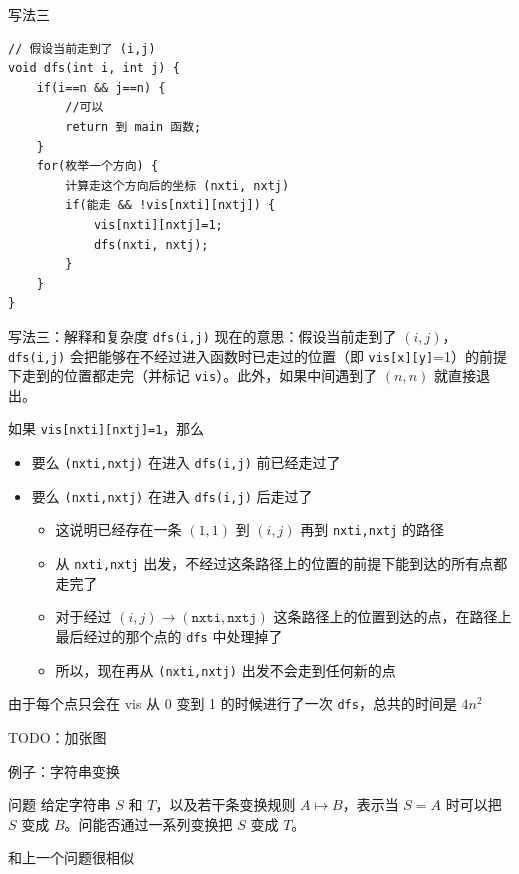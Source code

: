 \documentclass[11pt,aspectratio=169]{beamer}
\begin{document}
\begin{frame}[fragile]{写法三}
\begin{lstlisting}
// 假设当前走到了 (i,j) 
void dfs(int i, int j) {
    if(i==n && j==n) {
        //可以
        return 到 main 函数;
    }
    for(枚举一个方向) {
        计算走这个方向后的坐标 (nxti, nxtj)
        if(能走 && !vis[nxti][nxtj]) {
            vis[nxti][nxtj]=1;
            dfs(nxti, nxtj);
        }
    }
}
\end{lstlisting}    
\end{frame}

\begin{frame}{写法三：解释和复杂度}
\texttt{dfs(i,j)} 现在的意思：假设当前走到了 $(i,j)$，\texttt{dfs(i,j)} 会把能够在不经过进入函数时已走过的位置（即 \texttt{vis[x][y]}=1）的前提下走到的位置都走完（并标记 \texttt{vis}）。此外，如果中间遇到了 $(n,n)$ 就直接退出。

如果 \texttt{vis[nxti][nxtj]=1}，那么

\begin{itemize}
    \item 要么 \texttt{(nxti,nxtj)} 在进入 \texttt{dfs(i,j)} 前已经走过了
    \item 要么 \texttt{(nxti,nxtj)} 在进入 \texttt{dfs(i,j)} 后走过了
    \begin{itemize}
        \item 这说明已经存在一条 $(1,1)$ 到 $(i,j)$ 再到 \texttt{nxti,nxtj} 的路径
        \item 从 \texttt{nxti,nxtj} 出发，不经过这条路径上的位置的前提下能到达的所有点都走完了
        \item 对于经过 $(i,j)\to \mathtt{(nxti,nxtj)}$ 这条路径上的位置到达的点，在路径上最后经过的那个点的 \texttt{dfs} 中处理掉了
        \item 所以，现在再从 \texttt{(nxti,nxtj)} 出发不会走到任何新的点
    \end{itemize}
\end{itemize}

由于每个点只会在 vis 从 0 变到 1 的时候进行了一次 \texttt{dfs}，总共的时间是 $4n^2$

TODO：加张图

\end{frame}

\begin{frame}{例子：字符串变换}
    \begin{block}{问题}
        给定字符串 $S$ 和 $T$，以及若干条变换规则 $A\mapsto B$，表示当 $S=A$ 时可以把 $S$ 变成 $B$。问能否通过一系列变换把 $S$ 变成 $T$。
    \end{block}

    \pause

    和上一个问题很相似
\end{frame}
\end{document}

